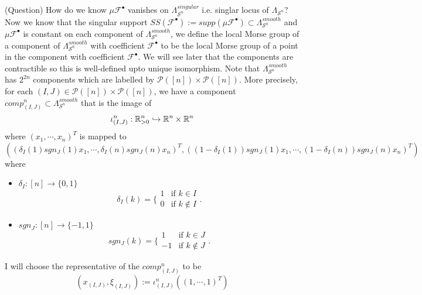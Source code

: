(Question) How do we know $\mu \mathscr{F}^{\bullet}$ vanishes on $\Lambda_{\mathcal{S}^n}^{singular}$ i.e. singlar locus of $\Lambda_{\mathcal{S}^n}$?
Now we know that the singular support $SS(\mathscr{F}^\bullet):= supp(\mu \mathscr{F}^\bullet) \subset \Lambda_{\mathcal{S}^n}^{smooth}$ and $\mu\mathcal{F}^\bullet$ is constant on each component of $\Lambda_{
\mathcal{S}^n}^{smooth}$, we define the local Morse group of a component of $\Lambda_{\mathcal{S}^n}^{smooth}$ with coefficient $\mathscr{F}^\bullet$ to be the local Morse group of a point in the component with coefficient $\mathscr{F}^\bullet$. We will see later that the components are contractible so this is well-defined upto unique isomorphism.
Note that $\Lambda_{\mathcal{S}^n}^{smooth}$ has $2^{2n}$ components which are labelled by $\mathcal{P}([n])\times \mathcal{P}([n])$. More precisely, for each $(I,J)\in \mathcal{P}([n])\times \mathcal{P}([n])$, we have a component $comp^n_{(I,J)}\subset \Lambda_{\mathcal{S}^n}^{smooth}$ that is the image of 
\[
\iota^n_{(I,J)}:\mathbb{R}^n_{>0} \hookrightarrow \mathbb{R}^n\times \mathbb{R}^n
\]
where $(x_1,\cdots,x_n)^T$ is mapped to 
\[((\delta_I(1)sgn_J(1)x_1,\cdots,\delta_I(n)sgn_J(n)x_n)^T,((1-\delta_I(1))sgn_J(1)x_1,\cdots,(1-\delta_I(n))sgn_J(n)x_n)^T)
\]
where
\begin{itemize}
\item $\delta_I : [n] \rightarrow \{0,1\}$
\[\delta_I(k)=\bigg\{
\begin{array}{ll}
    1 & \text{if } k\in I \\
    0 & \text{if } k\not\in I
\end{array}
\bigg.
\]

\item $sgn_J : [n] \rightarrow \{-1,1\}$
\[sgn_J(k)=\bigg\{
\begin{array}{ll}
    1 & \text{if } k\in J \\
    -1 & \text{if } k\not\in J
\end{array}
\bigg.
\]
\end{itemize}

I will choose the representative of the $comp^n_{(I,J)}$ to be 
\[
(x_{(I,J)},\xi_{(I,J)}) := \iota^n_{(I,J)}((1,\cdots,1)^T)
\]

